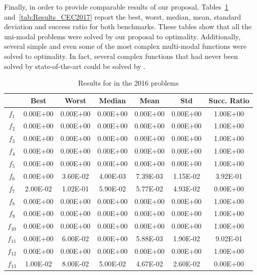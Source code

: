 Finally, in order to provide comparable results of our proposal, Tables~\ref{tab:Results_CEC2016} and~\ref{tab:Results_CEC2017} report the best, worst, median, 
mean, standard deviation and success ratio for both benchmarks.
%
These tables show that all the uni-modal problems were solved by our proposal to optimality.
%
Additionally, several simple and even some of the most complex multi-modal functions were solved to optimality.
%
In fact, several complex functions that had never been solved by state-of-the-art could be solved by \DEEDM{}.
%
\begin{table}[t]
\begin{scriptsize}
\centering
\caption{Results for \DEEDM{} in the \CEC{} 2016 problems}
\label{tab:Results_CEC2016}
\begin{tabular}{|c|c|c|c|c|c|c|}
\hline
 & \textbf{Best} & \textbf{Worst} & \textbf{Median} & \textbf{Mean} & \textbf{Std} & \textbf{Succ. Ratio} \\ \hline
$f_1$ & 0.00E+00 & 0.00E+00 & 0.00E+00 & 0.00E+00 & 0.00E+00 & 1.00E+00 \\ \hline
$f_2$ & 0.00E+00 & 0.00E+00 & 0.00E+00 & 0.00E+00 & 0.00E+00 & 1.00E+00 \\ \hline
$f_3$ & 0.00E+00 & 0.00E+00 & 0.00E+00 & 0.00E+00 & 0.00E+00 & 1.00E+00 \\ \hline
$f_4$ & 0.00E+00 & 0.00E+00 & 0.00E+00 & 0.00E+00 & 0.00E+00 & 1.00E+00 \\ \hline
$f_5$ & 0.00E+00 & 0.00E+00 & 0.00E+00 & 0.00E+00 & 0.00E+00 & 1.00E+00 \\ \hline
$f_6$ & 0.00E+00 & 3.60E-02 & 4.00E-03 & 7.39E-03 & 1.15E-02 & 3.92E-01 \\ \hline
$f_7$ & 2.00E-02 & 1.02E-01 & 5.90E-02 & 5.77E-02 & 4.93E-02 & 0.00E+00 \\ \hline
$f_8$ & 0.00E+00 & 0.00E+00 & 0.00E+00 & 0.00E+00 & 0.00E+00 & 1.00E+00 \\ \hline
$f_9$ & 0.00E+00 & 0.00E+00 & 0.00E+00 & 0.00E+00 & 0.00E+00 & 1.00E+00 \\ \hline
$f_{10}$ & 0.00E+00 & 0.00E+00 & 0.00E+00 & 0.00E+00 & 0.00E+00 & 1.00E+00 \\ \hline
$f_{11}$ & 0.00E+00 & 6.00E-02 & 0.00E+00 & 5.88E-03 & 1.90E-02 & 9.02E-01 \\ \hline
$f_{12}$ & 0.00E+00 & 0.00E+00 & 0.00E+00 & 0.00E+00 & 0.00E+00 & 1.00E+00 \\ \hline
$f_{13}$ & 1.00E-02 & 8.00E-02 & 5.00E-02 & 4.67E-02 & 2.60E-02 & 0.00E+00 \\ \hline

\end{tabular}
\end{scriptsize}
\end{table}
